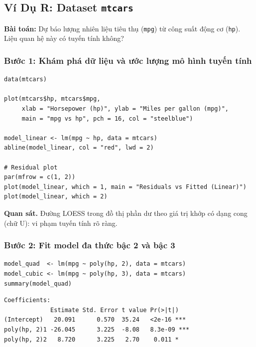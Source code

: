 \documentclass[12pt, a4paper]{article}
\begin{document}
\subsection{Ví Dụ R: Dataset \texttt{mtcars}}

\textbf{Bài toán:} Dự báo lượng nhiên liệu tiêu thụ (\texttt{mpg}) từ công suất động cơ (\texttt{hp}). Liệu quan hệ này có tuyến tính không?

\subsubsection*{Bước 1: Khám phá dữ liệu và ước lượng mô hình tuyến tính}

\begin{lstlisting}[style=Rstyle]
data(mtcars)

plot(mtcars$hp, mtcars$mpg,
     xlab = "Horsepower (hp)", ylab = "Miles per gallon (mpg)",
     main = "mpg vs hp", pch = 16, col = "steelblue")

model_linear <- lm(mpg ~ hp, data = mtcars)
abline(model_linear, col = "red", lwd = 2)

# Residual plot
par(mfrow = c(1, 2))
plot(model_linear, which = 1, main = "Residuals vs Fitted (Linear)")
plot(model_linear, which = 2)
\end{lstlisting}

\textbf{Quan sát.} Đường LOESS trong đồ thị phần dư theo giá trị khớp có dạng cong (chữ U): vi phạm tuyến tính rõ ràng.

\subsubsection*{Bước 2: Fit model đa thức bậc 2 và bậc 3}

\begin{lstlisting}[style=Rstyle]
model_quad  <- lm(mpg ~ poly(hp, 2), data = mtcars)
model_cubic <- lm(mpg ~ poly(hp, 3), data = mtcars)
summary(model_quad)
\end{lstlisting}

\begin{lstlisting}[style=output]
Coefficients:
             Estimate Std. Error t value Pr(>|t|)
(Intercept)   20.091      0.570  35.24   <2e-16 ***
poly(hp, 2)1 -26.045      3.225  -8.08   8.3e-09 ***
poly(hp, 2)2   8.720      3.225   2.70    0.011 *
\end{lstlisting}
\end{document}
